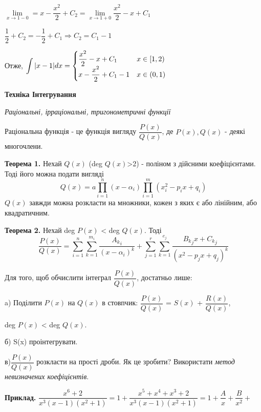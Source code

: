 \documentclass[12pt]{report}
\begin{document}
 $\lim\limits_{x \to 1-0} = x -\dfrac {x^2}{2} +C_2 = \lim\limits_{x \to 1+0} \dfrac {x^2}{2} -x +C_1$
 
$ \dfrac {1}{2} + C_2 = -\dfrac{1}{2}+C_1 \Rightarrow C_2 = C_1 -1 $

Отже, $\mathlarger{\int | x-1|}dx
=\begin{cases}
\dfrac {x^2}{2} -x +C_1 &  x \in [1,2)\\
x -\dfrac {x^2}{2} +C_1 - 1 & x\in (0,1)
\end{cases}$
\vspace{5mm}
\begin{center}
	\textbf{\large{Техніка Інтегрування}}
\end{center}
\textit{Раціональні, ірраціональні, тригонометричні функції} 

Раціональна функція - це функція вигляду $\dfrac{P(x)}{Q(x)}$,  де $P(x), Q(x)$ - деякі многочлени. 

\textbf{Теорема 1.} Нехай $Q(x)$  (deg $Q(x)$>2) - поліном з дійсними коефіцієнтами. Тоді його можна подати  вигляді \[ Q(x) = a\prod\limits_{i = 1}^n(x - \alpha_i)\prod\limits_{i = 1}^m(x_i^2 - p_ix + q_i) \]
$Q(x)$ завжди можна розкласти на множники, кожен з яких є або лінійним, або квадратичним.
\vspace{3mm}

\textbf{Теорема 2.}  Нехай deg $P(x)$ < deg $Q(x)$. 
Тоді 
 \[\dfrac{P(x)}{Q(x)} = \sum\limits_{i=1}^n  \sum\limits_{k=1}^{m_i} \dfrac{{A_k}_i}{(x -\alpha_i)^k} + \sum\limits_{j=1}^r \sum\limits_{k=1}^{e_j} \dfrac{{B_k}_jx+{C_k}_j}{(x^2 -p_jx + q_j)^k} \]

Для того, щоб обчислити інтеграл $\dfrac{P(x)}{Q(x)}$, достатньо лише:
\vspace{2mm}

a) Поділити $P(x)$ на $Q(x)$ в стовпчик: $\dfrac{P(x)}{Q(x)}$ = $S(x)$ + $\dfrac{R(x)}{Q(x)}$, 

deg $P(x)$ < deg $Q(x)$. 

б) S(x) проінтегрувати.

\vspace{2mm}

в)$\dfrac{P(x)}{Q(x)}$ розкласти на прості дроби. Як це зробити? Використати \textit{метод невизначених коефіцієнтів}.

\textbf{Приклад.} $\dfrac{x^6+2}{x^3(x-1)(x^2+1)} = 1 + \dfrac{x^5+x^4 +x^3 +2}{x^3(x-1)(x^2+1)} =1+  \dfrac{A}{x} + \dfrac{B}{x^2} +$

\vspace{3mm} 
\end{document}

